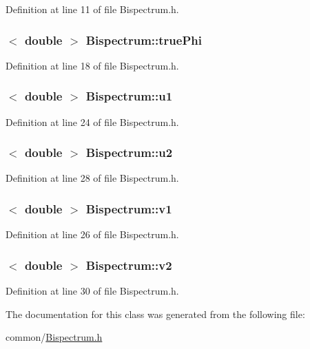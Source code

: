 Definition at line 11 of file Bispectrum.h.

\hypertarget{classBispectrum_ac6576cd26a230281ed9471dc18f6c128}{
\subsubsection[{truePhi}]{$<$ double $>$ {\bf Bispectrum::truePhi}}}
\label{classBispectrum_ac6576cd26a230281ed9471dc18f6c128}


Definition at line 18 of file Bispectrum.h.

\hypertarget{classBispectrum_a4aa12f9f42ec6a9a622eae258886a70a}{
\subsubsection[{u1}]{$<$ double $>$ {\bf Bispectrum::u1}}}
\label{classBispectrum_a4aa12f9f42ec6a9a622eae258886a70a}


Definition at line 24 of file Bispectrum.h.

\hypertarget{classBispectrum_a1273b649ed0b0395095e46553abd4590}{
\subsubsection[{u2}]{$<$ double $>$ {\bf Bispectrum::u2}}}
\label{classBispectrum_a1273b649ed0b0395095e46553abd4590}


Definition at line 28 of file Bispectrum.h.

\hypertarget{classBispectrum_aaaba6a43c24620293150b6c8b1e7e3cc}{
\subsubsection[{v1}]{$<$ double $>$ {\bf Bispectrum::v1}}}
\label{classBispectrum_aaaba6a43c24620293150b6c8b1e7e3cc}


Definition at line 26 of file Bispectrum.h.

\hypertarget{classBispectrum_a3f96bf8f14f36a1b554f094e74eea14e}{
\subsubsection[{v2}]{$<$ double $>$ {\bf Bispectrum::v2}}}
\label{classBispectrum_a3f96bf8f14f36a1b554f094e74eea14e}


Definition at line 30 of file Bispectrum.h.



The documentation for this class was generated from the following file:\begin{DoxyCompactItemize}
\item 
common/\hyperlink{Bispectrum_8h}{Bispectrum.h}\end{DoxyCompactItemize}
